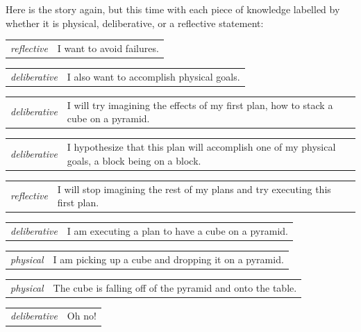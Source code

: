 Here is the story again, but this time with each piece of knowledge
labelled by whether it is physical, deliberative, or a reflective
statement:

\begin{tabular}{p{2cm}p{8cm}}
  {\emph{reflective}} & I want to avoid failures. \\
\end{tabular}

\begin{tabular}{p{2cm}p{8cm}}
  {\emph{deliberative}} & I also want to accomplish physical goals. \\
\end{tabular}

\begin{tabular}{p{2cm}p{8cm}}
  {\emph{deliberative}} & I will try imagining the effects of my first
  plan, how to stack a cube on a pyramid. \\
\end{tabular}

\begin{tabular}{p{2cm}p{8cm}}
  {\emph{deliberative}} & I hypothesize that this plan will accomplish
  one of my physical goals, a block being on a block. \\
\end{tabular}

\begin{tabular}{p{2cm}p{8cm}}
  {\emph{reflective}} & I will stop imagining the rest of my plans and
  try executing this first plan. \\
\end{tabular}

\begin{tabular}{p{2cm}p{8cm}}
  {\emph{deliberative}} & I am executing a plan to have a cube on a
  pyramid. \\
\end{tabular}

\begin{tabular}{p{2cm}p{8cm}}
  {\emph{physical}} & I am picking up a cube and dropping it on a
  pyramid. \\
\end{tabular}

\begin{tabular}{p{2cm}p{8cm}}
  {\emph{physical}} & The cube is falling off of the pyramid and onto
  the table. \\
\end{tabular}

\begin{tabular}{p{2cm}p{8cm}}
  {\emph{deliberative}} & Oh no! \\
\end{tabular}

